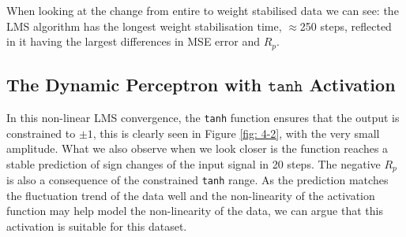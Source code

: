 \documentclass[12pt]{article}
\numberwithin{equation}{section}
\begin{document}
		When looking at the change from entire to weight stabilised data we can see: the LMS algorithm has the longest weight stabilisation time, $\approx$250 steps, reflected in it having the largest differences in MSE error and $R_p$.
	\subsection{The Dynamic Perceptron with $\texttt{tanh}$ Activation} \label{sec: 4-2-dynamic-perc}
		\begin{minipage}[b]{0.49\textwidth}
			In this non-linear LMS convergence, the \texttt{tanh} function ensures that the output is constrained to $\pm1$, this is clearly seen in Figure \ref{fig: 4-2}, with the very small amplitude. What we also observe when we look closer is the function reaches a stable prediction of sign changes of the input signal in 20 steps. The negative $R_p$ is also a consequence of the constrained \texttt{tanh} range. As the prediction matches the fluctuation trend of the data well  and the non-linearity of the activation function may help model the non-linearity of the data, we can argue that this activation is suitable for this dataset. 
		\end{minipage}%
		\begin{minipage}{0.04\textwidth}
			\hspace*{0.04\textwidth}
		\end{minipage}%
\end{document}
